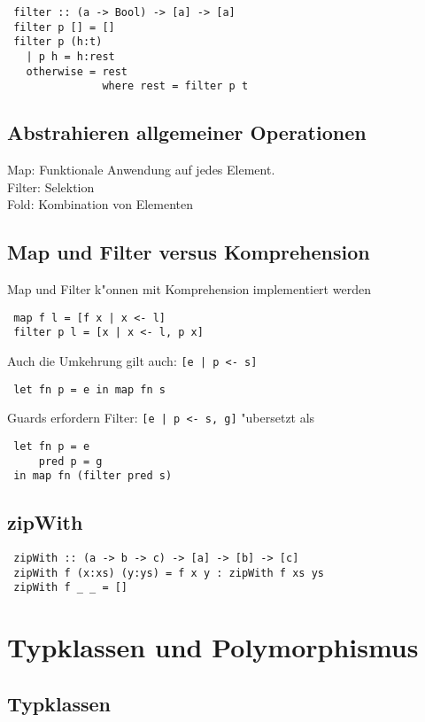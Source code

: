 \documentclass[german,10pt, a4paper, twocolumn]{scrartcl}
\theoremstyle{definition}
\theoremstyle{remark}
\begin{document}
\begin{verbatim}
 filter :: (a -> Bool) -> [a] -> [a]
 filter p [] = []
 filter p (h:t)
   | p h = h:rest
   otherwise = rest
               where rest = filter p t
\end{verbatim}

\subsection{Abstrahieren allgemeiner Operationen}

Map: Funktionale Anwendung auf jedes Element.\\
Filter: Selektion\\
Fold: Kombination von Elementen

\subsection{Map und Filter versus Komprehension}

Map und Filter k"onnen mit Komprehension implementiert werden
\begin{verbatim}
 map f l = [f x | x <- l]
 filter p l = [x | x <- l, p x]
\end{verbatim}

Auch die Umkehrung gilt auch: \verb#[e | p <- s]#
\begin{verbatim}
 let fn p = e in map fn s
\end{verbatim}

Guards erfordern Filter: \verb#[e | p <- s, g]# "ubersetzt als
\begin{verbatim}
 let fn p = e
     pred p = g
 in map fn (filter pred s)
\end{verbatim}

\subsection{zipWith}

\begin{verbatim}
 zipWith :: (a -> b -> c) -> [a] -> [b] -> [c]
 zipWith f (x:xs) (y:ys) = f x y : zipWith f xs ys
 zipWith f _ _ = []
\end{verbatim}

\section{Typklassen und Polymorphismus}

\subsection{Typklassen}
\end{document}

